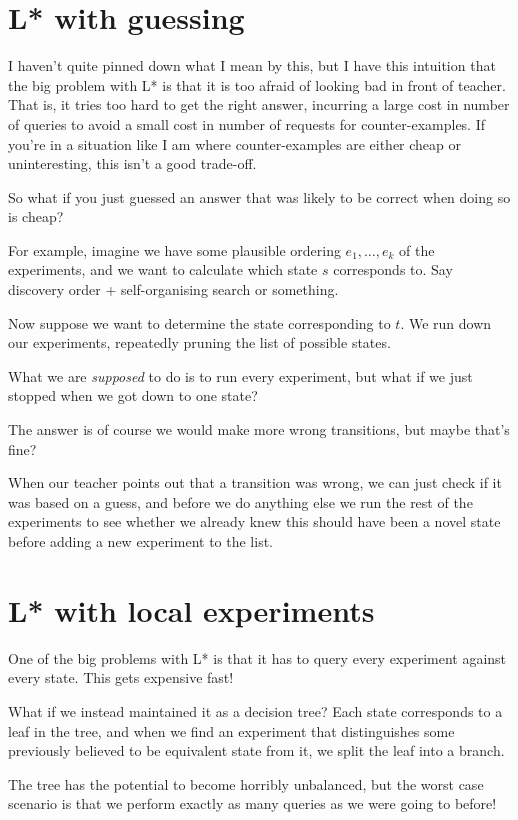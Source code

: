 \documentclass[a4paper]{book}
\begin{document}
\section{L* with guessing}

I haven't quite pinned down what I mean by this,
but I have this intuition that the big problem with L* is that it is too afraid of looking bad in front of teacher.
That is,
it tries too hard to get the right answer,
incurring a large cost in number of queries to avoid a small cost in number of requests for counter-examples.
If you're in a situation like I am where counter-examples are either cheap or uninteresting,
this isn't a good trade-off.

So what if you just guessed an answer that was likely to be correct when doing so is cheap?

For example, imagine we have some plausible ordering \(e_1, \ldots, e_k\) of the experiments,
and we want to calculate which state \(s\) corresponds to.
Say discovery order + self-organising search or something.

Now suppose we want to determine the state corresponding to \(t\).
We run down our experiments,
repeatedly pruning the list of possible states.

What we are \emph{supposed} to do is to run every experiment,
but what if we just stopped when we got down to one state?

The answer is of course we would make more wrong transitions,
but maybe that's fine?

When our teacher points out that a transition was wrong,
we can just check if it was based on a guess,
and before we do anything else we run the rest of the experiments to see whether we already knew this should have been a novel state before adding a new experiment to the list.

\section{L* with local experiments}\label{sec:lstarlocal}

One of the big problems with L* is that it has to query every experiment against every state.
This gets expensive fast!

What if we instead maintained it as a decision tree?
Each state corresponds to a leaf in the tree,
and when we find an experiment that distinguishes some previously believed to be equivalent state from it,
we split the leaf into a branch.

The tree has the potential to become horribly unbalanced,
but the worst case scenario is that we perform exactly as many queries as we were going to before!
\end{document}
